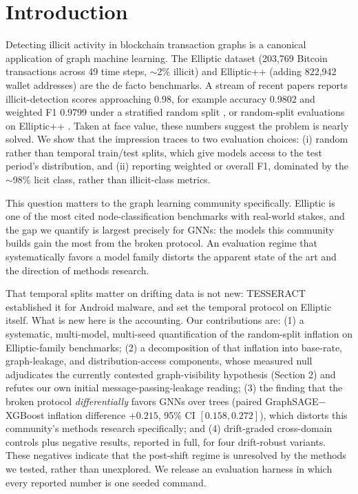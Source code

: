 \documentclass{article}
\begin{document}
\section{Introduction}
Detecting illicit activity in blockchain transaction graphs is a canonical
application of graph machine learning. The Elliptic dataset
\citep{weber2019aml} (203{,}769 Bitcoin transactions across 49 time steps,
$\sim$2\% illicit) and Elliptic++ \citep{elmougy2023elliptic} (adding 822{,}942
wallet addresses) are the de facto benchmarks. A stream of recent papers reports
illicit-detection scores approaching 0.98, for example accuracy 0.9802 and
weighted F1 0.9799 under a stratified random split \citep{lin2026wavelet}, or
random-split evaluations on Elliptic++ \citep{nguyen2025sagefin}. Taken at face
value, these numbers suggest the problem is nearly solved. We show that the
impression traces to two evaluation choices: (i) random rather than temporal train/test splits, which give
models access to the test period's distribution, and (ii) reporting weighted or
overall F1, dominated by the $\sim$98\% licit class, rather than illicit-class
metrics.

This question matters to the graph learning community specifically. Elliptic is
one of the most cited node-classification benchmarks with real-world stakes, and
the gap we quantify is largest precisely for GNNs: the models this community
builds gain the most from the broken protocol. An evaluation regime that
systematically favors a model family distorts the apparent state of the art and
the direction of methods research.

That temporal splits matter on drifting data is not new: TESSERACT
\citep{pendlebury2019tesseract} established it for Android malware, and
\citet{weber2019aml} set the temporal protocol on Elliptic itself. What is new
here is the accounting. Our contributions are: (1) a systematic, multi-model,
multi-seed quantification of the random-split inflation on Elliptic-family
benchmarks; (2) a decomposition of that inflation into base-rate, graph-leakage,
and distribution-access components, whose measured null adjudicates the
currently contested graph-visibility hypothesis (Section 2) and refutes our own
initial message-passing-leakage reading; (3) the finding that the broken
protocol \emph{differentially} favors GNNs over trees (paired
GraphSAGE$-$XGBoost inflation difference $+0.215$, 95\% CI $[0.158, 0.272]$),
which distorts this community's methods research specifically; and (4)
drift-graded cross-domain controls plus negative results, reported in full, for
four drift-robust variants. These negatives indicate that the post-shift regime
is unresolved by the methods we tested, rather than unexplored. We release an
evaluation harness in which every reported number is one seeded command.
\end{document}
